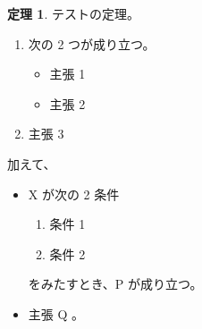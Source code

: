 \documentclass[uplatex,dvipdfmx,a4paper]{jsarticle}
\theoremstyle{definition}
\newtheorem{theorem}{定理}[subsection]
\begin{document}
\begin{theorem}
テストの定理。
\begin{enumerate}%
    \item 次の 2 つが成り立つ。
        \begin{itemize}%
            \item 主張 1
            \item 主張 2
        \end{itemize}%
    \item 主張 3
\end{enumerate}%
加えて、
\begin{itemize}%
    \item X が次の 2 条件
        \begin{enumerate}%
            \item 条件 1
            \item 条件 2
        \end{enumerate}%
    をみたすとき、P が成り立つ。
    \item 主張 Q 。
\end{itemize}%
\end{theorem}
\end{document}
